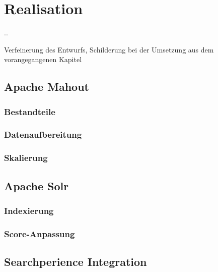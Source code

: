 \section{Realisation}\newpage.\newpage\newpage.\newpage
	
	Verfeinerung des Entwurfs, Schilderung bei der Umsetzung aus dem vorangegangenen Kapitel

	
\subsection{Apache Mahout}
\subsubsection{Bestandteile}
\subsubsection{Datenaufbereitung}
\subsubsection{Skalierung}
\subsection{Apache Solr}

\subsubsection{Indexierung}
\subsubsection{Score-Anpassung}






\subsection{Searchperience Integration}